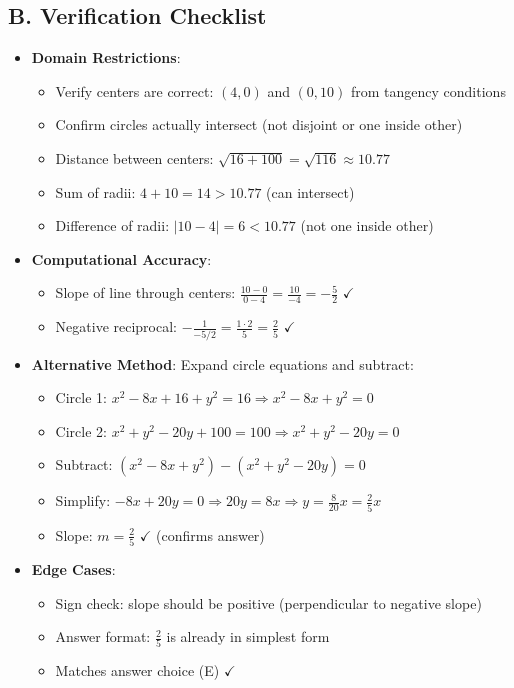 \documentclass[12pt]{article}
\begin{document}
\begin{verificationbox}
\subsection*{B. Verification Checklist}
\begin{itemize}[leftmargin=*]
    \item \textbf{Domain Restrictions}: 
    \begin{itemize}
        \item[$\checkmark$] Verify centers are correct: $(4,0)$ and $(0,10)$ from tangency conditions
        \item[$\checkmark$] Confirm circles actually intersect (not disjoint or one inside other)
        \item[$\checkmark$] Distance between centers: $\sqrt{16+100} = \sqrt{116} \approx 10.77$
        \item[$\checkmark$] Sum of radii: $4 + 10 = 14 > 10.77$ (can intersect)
        \item[$\checkmark$] Difference of radii: $|10-4| = 6 < 10.77$ (not one inside other)
    \end{itemize}
    \item \textbf{Computational Accuracy}: 
    \begin{itemize}
        \item[$\checkmark$] Slope of line through centers: $\frac{10-0}{0-4} = \frac{10}{-4} = -\frac{5}{2}$ $\checkmark$
        \item[$\checkmark$] Negative reciprocal: $-\frac{1}{-5/2} = \frac{1 \cdot 2}{5} = \frac{2}{5}$ $\checkmark$
    \end{itemize}
    \item \textbf{Alternative Method}: Expand circle equations and subtract:
    \begin{itemize}
        \item Circle 1: $x^2 - 8x + 16 + y^2 = 16 \Rightarrow x^2 - 8x + y^2 = 0$
        \item Circle 2: $x^2 + y^2 - 20y + 100 = 100 \Rightarrow x^2 + y^2 - 20y = 0$
        \item Subtract: $(x^2 - 8x + y^2) - (x^2 + y^2 - 20y) = 0$
        \item Simplify: $-8x + 20y = 0 \Rightarrow 20y = 8x \Rightarrow y = \frac{8}{20}x = \frac{2}{5}x$
        \item Slope: $m = \frac{2}{5}$ $\checkmark$ (confirms answer)
    \end{itemize}
    \item \textbf{Edge Cases}: 
    \begin{itemize}
        \item[$\checkmark$] Sign check: slope should be positive (perpendicular to negative slope)
        \item[$\checkmark$] Answer format: $\frac{2}{5}$ is already in simplest form
        \item[$\checkmark$] Matches answer choice (E) $\checkmark$
    \end{itemize}
\end{itemize}
\end{verificationbox}
\end{document}
